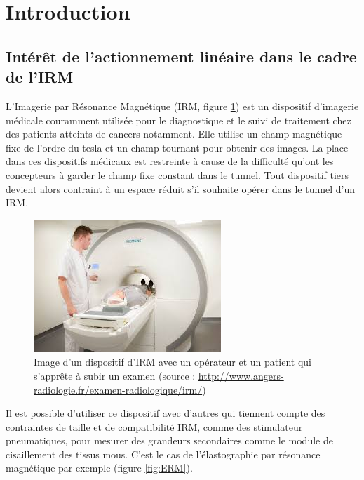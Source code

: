 \documentclass[10pt, a4paper]{article}
\begin{document}

\tableofcontents
\newpage

\section{Introduction}
    \subsection{Intérêt de l'actionnement linéaire dans le cadre de l'IRM}
    
     L'Imagerie par Résonance Magnétique (IRM, figure \ref{fig:IRM}) est un dispositif d'imagerie médicale couramment utilisée pour le diagnostique et le suivi de traitement chez des patients atteints de cancers notamment. Elle utilise un champ magnétique fixe de l'ordre du tesla et un champ tournant pour obtenir des images. La place dans ces dispositifs médicaux est restreinte à cause de la difficulté qu'ont les concepteurs à garder le champ fixe constant dans le tunnel. Tout dispositif tiers devient alors contraint à un espace réduit s'il souhaite opérer dans le tunnel d'un IRM. \\


\begin{figure}[ht!]
\centering
\includegraphics[scale=1]{ImageIntro/IRM.jpg}
\caption{Image d'un dispositif d'IRM avec un opérateur et un patient qui s'apprête à subir un examen (source : \url{http://www.angers-radiologie.fr/examen-radiologique/irm/}) }
\label{fig:IRM}
\end{figure}


    Il est possible d'utiliser ce dispositif avec d'autres qui tiennent compte des contraintes de taille et de compatibilité IRM, comme des stimulateur pneumatiques, pour mesurer des grandeurs secondaires comme le module de cisaillement des tissus mous. C'est le cas de l'élastographie par résonance magnétique \cite{Ehman2012} par exemple (figure \ref{fig:ERM}).\\
    
\end{document}
